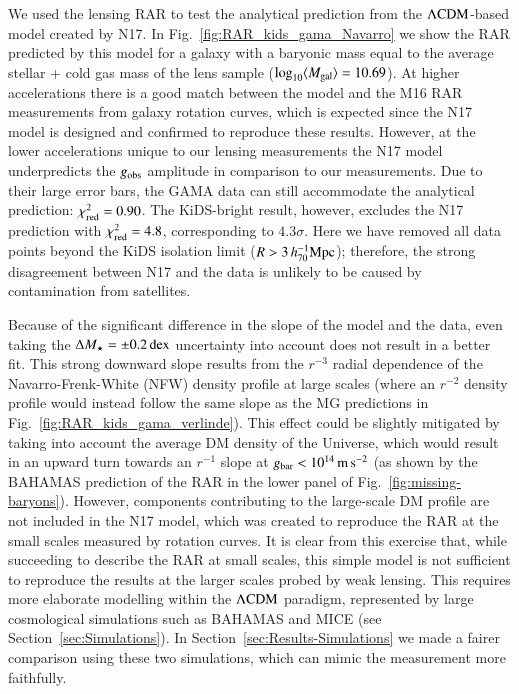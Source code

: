 \documentclass{aa}
\newcommand{\hMpc}{\,h_{70}^{-1}{\rm{Mpc}} }
\newcommand{\mpss}{\,{\rm m}\,{\rm s}^{-2} }
\newcommand{\dex}{\,{\rm dex}}
\renewcommand{\Updelta}{{\rm \Delta}}
\newcommand{\lcdm}{{\rm \Lambda CDM}}
\newcommand*{\meanb}[1]{\langle{#1}\rangle}
\newcommand{\un}[1]{_{\rm #1}}
\begin{document}
We used the lensing RAR to test the analytical prediction from the $\lcdm$-based model created by N17. In Fig.~\ref{fig:RAR_kids_gama_Navarro} we show the RAR predicted by this model for a galaxy with a baryonic mass equal to the average stellar + cold gas mass of the lens sample ($\log_{10}\meanb{M\un{gal}} = 10.69$). At higher accelerations there is a good match between the model and the M16 RAR measurements from galaxy rotation curves, which is expected since the N17 model is designed and confirmed to reproduce these results. However, at the lower accelerations unique to our lensing measurements the N17 model underpredicts the $g\un{obs}$ amplitude in comparison to our measurements. Due to their large error bars, the GAMA data can still accommodate the analytical prediction: $\chi\un{red}^2 = 0.90$. The KiDS-bright result, however, excludes the N17 prediction with $\chi\un{red}^2 = 4.8$, corresponding to $4.3 \sigma$. Here we have removed all data points beyond the KiDS isolation limit ($R>3 \hMpc$); therefore, the strong disagreement between N17 and the data is unlikely to be caused by contamination from satellites.

Because of the significant difference in the slope of the model and the data, even taking the $\Updelta M_\star=\pm0.2\dex$ uncertainty into account does not result in a better fit. This strong downward slope results from the $r^{-3}$ radial dependence of the Navarro-Frenk-White (NFW) density profile at large scales (where an $r^{-2}$ density profile would instead follow the same slope as the MG predictions in Fig.~\ref{fig:RAR_kids_gama_verlinde}). This effect could be slightly mitigated by taking into account the average DM density of the Universe, which would result in an upward turn towards an $r^{-1}$ slope at $g\un{bar}<10^{14}\mpss$ (as shown by the BAHAMAS prediction of the RAR in the lower panel of Fig.~\ref{fig:missing-baryons}). However, components contributing to the large-scale DM profile are not included in the N17 model, which was created to reproduce the RAR at the small scales measured by rotation curves. It is clear from this exercise that, while succeeding to describe the RAR at small scales, this simple model is not sufficient to reproduce the results at the larger scales probed by weak lensing. This requires more elaborate modelling within the $\lcdm$ paradigm, represented by large cosmological simulations such as BAHAMAS and MICE (see Section~\ref{sec:Simulations}). In Section~\ref{sec:Results-Simulations} we made a fairer comparison using these two simulations, which can mimic the measurement more faithfully.
\end{document}
